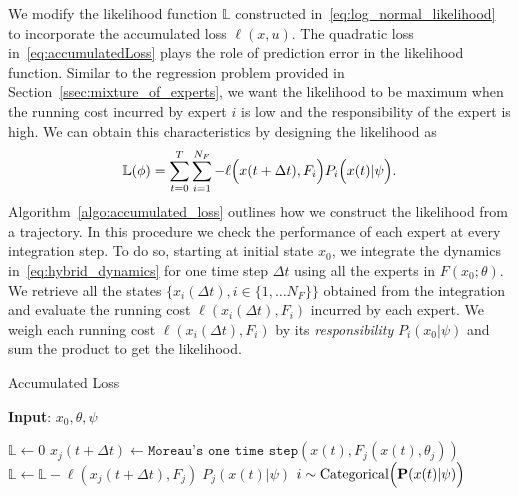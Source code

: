 \begin{enumerate}
    We modify the likelihood function $\mathbb{L}$ constructed
    in~\eqref{eq:log_normal_likelihood} to incorporate the accumulated loss
    $\ell(x, u)$.
    The quadratic loss in~\eqref{eq:accumulatedLoss} plays the role of prediction
    error in the likelihood function.
    Similar to the regression problem provided in
    Section~\ref{ssec:mixture_of_experts}, we want the likelihood to be maximum
    when the running cost incurred by expert $i$ is low and the responsibility
    of the expert is high.
    We can obtain this characteristics by designing the likelihood as
    \begin{align}
        \mathbb{L}(\phi) = \sum_{t=0}^{T} \sum_{i=1}^{N_F} - \ell \Bigl(x(t+\Delta t), F_i \Bigr) P_i\Bigl(x(t) | \psi \Bigr)  .
        \label{eq:accumulated_likelihood}
    \end{align}
    Algorithm~\ref{algo:accumulated_loss} outlines how we construct the
    likelihood from a trajectory.
    In this procedure we check the performance of each expert at every
    integration step.
    To do so, starting at initial state $x_0$, we integrate the dynamics
    in~\eqref{eq:hybrid_dynamics} for one time step $\Delta t$ using all the
    experts in $F(x_0;\theta)$.
    We retrieve all the states $\{ x_i(\Delta t) , i \in \{1, \dots N_F \}\}$
    obtained from the integration and evaluate the running cost $\ell(x_i(\Delta
    t), F_i)$ incurred by each expert.
    We weigh each running cost $\ell(x_i(\Delta t), F_i)$ by its
    \textit{responsibility} $P_i(x_0 | \psi)$ and sum the product to get the
    likelihood.
    \begin{algorithm}[tb]
        \caption{Accumulated Loss}
        \label{algo:accumulated_loss}
        \small
        \hspace*{\algorithmicindent} \textbf{Input}: $x_0, \theta, \psi$
        \begin{algorithmic}[1]
            \State $\mathbb{L} \leftarrow 0$
                    \State $x_j(t+\Delta t) \leftarrow \texttt{Moreau's one time step}(x(t), F_j(x(t), \theta_j))$
                    \State $\mathbb{L} \leftarrow \mathbb{L} - \ell(x_j(t+\Delta t), F_j) \; P_j(x(t) | \psi)$
                \EndFor
                \State $i \sim \text{Categorical}\Bigl(\mathbf{P}(x(t)| \psi)\Bigr)$ 

\end{algorithmic}
\end{algorithm}
\end{enumerate}
